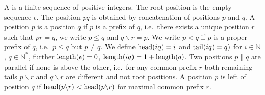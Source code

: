 
\begin{definition}\label{def:position}
	A  is a finite sequence of positive integers.
	The root position is the empty sequence $\epsilon$.
	The position $pq$ is obtained by concatenation of positions $p$ and $q$.
	A position $p$ is  a position $q$ if $p$ is a prefix of $q$,
	i.e.~there exists a unique position $r$ such that $pr = q$,
	we write $p\leq q$ and $q\backslash r = p$.
	We write $p<q$ if $p$ is a proper prefix of $q$, i.e.~$p\leq q$ but $p\neq q$.
	We define $\operatorname{head}(iq)=i$ and $\operatorname{tail}(iq) = q)$ for $i\in\mathbb{N}$, $q\in\mathbb{N}^*$,
	further $\operatorname{length}(\epsilon)=0$, $\operatorname{length}(iq) = 1 + \operatorname{length}(q)$.
%
	Two positions $p\parallel q$ are parallel if none is above the other,
	i.e.~for any common prefix $r$ both remaining tails
	$p\backslash r$ and $q\backslash r$ are different and not root positions.
	A position $p$ is left of position $q$ if $\operatorname{head}(p\backslash r) < \operatorname{head}(p\backslash r)$
	for maximal common prefix $r$.

\end{definition}

